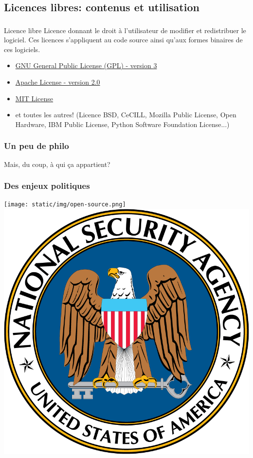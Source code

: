 \documentclass{beamer}
\begin{document}
\subsection{Licences libres: contenus et utilisation}
\begin{frame}
	\frametitle{\insertsubsection}
	
	\begin{block}{Licence libre}
		Licence donnant le droit à l'utilisateur de modifier et redistribuer le logiciel. Ces licences s'appliquent au code source ainsi qu'aux formes binaires de ces logiciels.
	\end{block}

	\begin{itemize}
		\item<2-> \href{https://www.gnu.org/licenses/gpl-3.0.fr.html}{GNU General Public License (GPL) - version 3}
		\item<3-> \href{https://apache.org/licenses/}{Apache License - version 2.0}
		\item<4-> \href{https://mit-license.org/}{MIT License}
		\item<5-> et toutes les autres! (Licence BSD, CeCILL, Mozilla Public License, Open Hardware, IBM Public License, Python Software Foundation License...)
	\end{itemize}
	
\end{frame}

\begin{frame}
	\frametitle{Un peu de philo}
	{\LARGE\centering Mais, du coup, à qui ça appartient?}
\end{frame}

\begin{frame}
	\frametitle{Des enjeux politiques}
	
	\texttt{[image: static/img/open-source.png]} \hfill \includegraphics[width=.45\linewidth]{static/img/nsa.png}
	
\end{frame}
\end{document}
